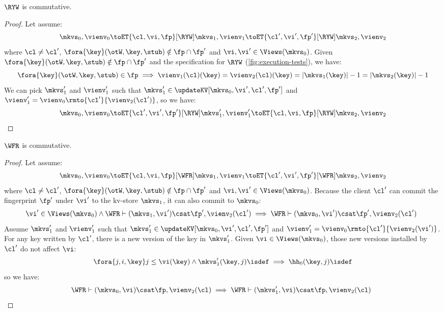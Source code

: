 \begin{lemma}
    \label{lem:ryw-comm}
    \(\RYW\) is commutative.
\end{lemma}
\begin{proof}
    Let assume:
    \[
        \mkvs_0, \vienv_0 \toET{\cl, \vi, \fp}[\RYW] \mkvs_1, \vienv_1 \toET{\cl', \vi', \fp'}[\RYW] \mkvs_2, \vienv_2 
    \]
    where \( \cl \neq \cl' \), \( \fora{ \key } (\otW, \key, \stub) \notin \fp \cap \fp' \) and \( \vi, \vi' \in \Views(\mkvs_0)\).
    Given \( \fora{ \key } (\otW, \key, \stub) \notin \fp \cap \fp' \) and the specification for \( \RYW \) (\cref{fig:execution-tests}), we have:
    \[
        \fora{\key} (\otW, \key, \stub) \in \fp \implies \vienv_1(\cl)(\key) = \vienv_2(\cl)(\key) = \lvert \mkvs_1(\key) \rvert - 1 = \lvert \mkvs_2(\key) \rvert - 1
    \]
    We can pick \( \mkvs'_1 \) and \( \vienv'_1 \) such that \( \mkvs'_1 \in \updateKV[\mkvs_0,\vi',\cl',\fp'] \) and \( \vienv'_1 = \vienv_0\rmto{\cl'}{\vienv_2(\cl')} \), so we have:
    \[
        \mkvs_0, \vienv_0 \toET{\cl', \vi', \fp'}[\RYW] \mkvs'_1, \vienv'_1 \toET{\cl, \vi, \fp}[\RYW] \mkvs_2, \vienv_2 
    \]
\end{proof}

\begin{lemma}
    \label{lem:wfr-comm}
    \(\WFR\) is commutative.
\end{lemma}
\begin{proof}
    Let assume:
    \[
        \mkvs_0, \vienv_0 \toET{\cl, \vi, \fp}[\WFR] \mkvs_1, \vienv_1 \toET{\cl', \vi', \fp'}[\WFR] \mkvs_2, \vienv_2 
    \]
    where \( \cl \neq \cl' \), \( \fora{ \key } (\otW, \key, \stub) \notin \fp \cap \fp' \) and \( \vi, \vi' \in \Views(\mkvs_0)\).
    Because the client \( \cl' \) can commit the fingerprint \( \fp' \) under \( \vi' \) to the kv-store \( \mkvs_1 \), it can also commit to \( \mkvs_0 \):
    \[
        \begin{array}{@{}l}
            \vi' \in \Views(\mkvs_0) \land \WFR \vdash (\mkvs_1, \vi') \csat \fp', \vienv_2(\cl') \implies  \WFR \vdash (\mkvs_0, \vi') \csat \fp', \vienv_2(\cl')
        \end{array}
    \]
    Assume \( \mkvs'_1 \) and \( \vienv'_1 \) such that \( \mkvs'_1 \in \updateKV[\mkvs_0,\vi',\cl',\fp'] \) and \( \vienv'_1 = \vienv_0\rmto{\cl'}{\vienv_2(\vi')} \).
    For any key written by \( \cl' \), there is a new version of the key in \( \mkvs'_1 \).
    Given \( \vi \in \Views(\mkvs_0)\), those new versions installed by \( \cl' \) do not affect \( \vi \):
    \[
        \fora{j,i, \key} j \leq \vi(\key) \land \mkvs'_1(\key, j)\isdef \implies \hh_0(\key, j)\isdef
    \]
    so we have:
    \[
        \begin{array}{@{}l}
            \WFR \vdash (\mkvs_0, \vi) \csat \fp, \vienv_2(\cl) \implies \WFR \vdash (\mkvs'_1, \vi) \csat \fp, \vienv_2(\cl)
        \end{array}
    \]
\end{proof}

